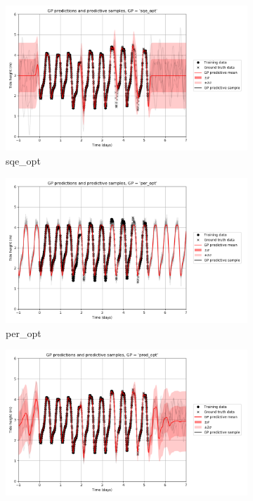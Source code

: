 \documentclass{article}
\begin{document}
\begin{figure}[pht]
    \centering
    \begin{subfigure}{0.45\textwidth}
        \centering
        \includegraphics[width=\textwidth]{GP_predictions_and_predictive_samples,_GP____sqe_opt_.png}
        \caption{sqe\_opt}
        \label{fig:pred_samples_sqe_opt}
    \end{subfigure}
    \begin{subfigure}{0.45\textwidth}
        \centering
        \includegraphics[width=\textwidth]{GP_predictions_and_predictive_samples,_GP____per_opt_.png}
        \caption{per\_opt}
        \label{fig:pred_samples_per_opt}
    \end{subfigure}
    \newline
    \begin{subfigure}{0.45\textwidth}
        \centering
        \includegraphics[width=\textwidth]{GP_predictions_and_predictive_samples,_GP____prod_opt_.png}

\end{subfigure}
\end{figure}
\end{document}
